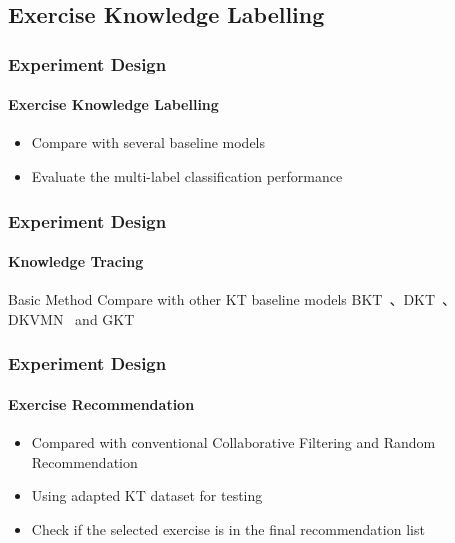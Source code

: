 \documentclass{beamer}
\begin{document}
\subsection{Exercise Knowledge Labelling}
\begin{frame}
	\frametitle{Experiment Design}
	\framesubtitle{Exercise Knowledge Labelling}
	\begin{itemize}
		\item Compare with several baseline models
		\item Evaluate the multi-label classification performance
	\end{itemize}
\end{frame}

\begin{frame}
	\frametitle{Experiment Design}
	\framesubtitle{Knowledge Tracing}
	\begin{block}{Basic Method}
		Compare with other KT baseline models BKT~\cite{yudelson2013individualized}、DKT~\cite{piech2015deep}、DKVMN~\cite{chen2017improving} and GKT~\cite{nakagawa2019graph}
	\end{block}
	\begin{table}[htbp!]
		\centering
		\caption{Dataset Statistics}\label{tbl:ch2-tb1}
	\end{table}
\end{frame}

\begin{frame}
	\frametitle{Experiment Design}
	\framesubtitle{Exercise Recommendation}
	\begin{itemize}
		\item Compared with conventional Collaborative Filtering and Random Recommendation
		\item Using adapted KT dataset for testing
		\item Check if the selected exercise is in the final recommendation list
	\end{itemize}
\end{frame}
\end{document}
